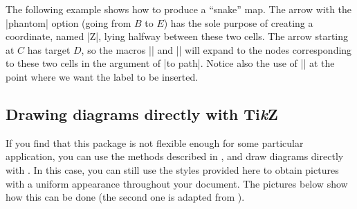 \documentclass[a4paper]{ltxdoc}
\begin{document}
The following example shows how to produce a ``snake'' map.  The arrow
with the |phantom| option (going from $B$ to $E$) has the sole purpose
of creating a coordinate, named |Z|, lying halfway between these two
cells.  The arrow starting at $C$ has target $D$, so the macros
|\tikztostart| and |\tikztotarget| will expand to the nodes
corresponding to these two cells in the argument of |to path|.  Notice
also the use of |\tikztonodes| at the point where we want the label to
be inserted.
\begin{codeexample}[]
\end{codeexample}

\subsection{Drawing diagrams directly with Ti\emph{k}Z}
\label{sec:draw-diagr-directly}

If you find that this package is not flexible enough for some
particular application, you can use the methods described in
\cite{lenders}, \cite{milne} and draw diagrams directly with
\tikzname.  In this case, you can still use the styles provided here
to obtain pictures with a uniform appearance throughout your document.
The pictures below show how this can be done (the second one is
adapted from \cite{milne}).

\begin{codeexample}[]
\end{codeexample}
\end{document}
